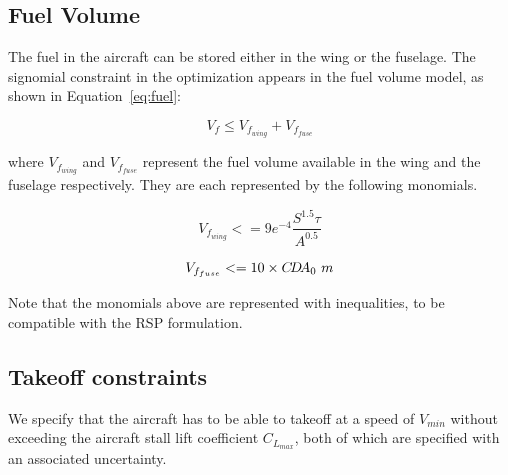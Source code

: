 \subsection{Fuel Volume}
The fuel in the aircraft can be stored either in the wing or the fuselage.
The signomial constraint in the optimization appears in the fuel volume model, as shown in Equation~\ref{eq:fuel}:

\begin{equation}
\label{eq:fuel}
V_f \leq V_{f_{wing}} + V_{f_{fuse}} 
\end{equation}

where $V_{f_{wing}}$ and $V_{f_{fuse}}$ represent the fuel volume available in the wing
and the fuselage respectively. They are each represented by the following monomials.

\begin{equation}
\label{eq:fuelwing}
V_{f_{wing}} <= 9e^{-4}\frac{S^{1.5}\tau}{A^{0.5}}
\end{equation}

\begin{equation}
\label{eq:fuelfuse}
V_{f_{fuse}} <= 10 \times C\!D\!A_0~m
\end{equation}

Note that the monomials above are represented with inequalities, to be compatible with the RSP formulation. 

\subsection{Takeoff constraints}
We specify that the aircraft has to be able to takeoff at a speed of $V_{min}$
without exceeding the aircraft stall lift coefficient $C_{L_{max}}$, both of which are
specified with an associated uncertainty.
